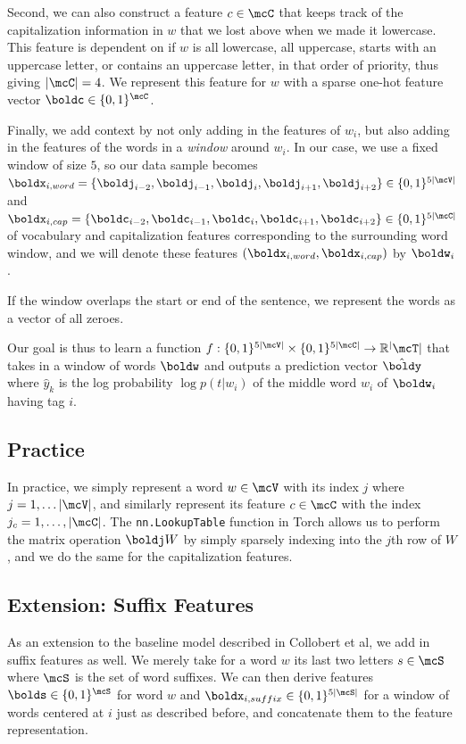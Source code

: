 \documentclass[11pt]{article}
\begin{document}
Second, we can also construct a feature $c \in \mcC$ that keeps track of the capitalization information in $w$ that we lost above when we made it lowercase. This feature is dependent on if $w$ is all lowercase, all uppercase, starts with an uppercase letter, or contains an uppercase letter, in that order of priority, thus giving $|\mcC| = 4$. We represent this feature for $w$ with a sparse one-hot feature vector $\boldc \in \{0,1\}^\mcC$.

Finally, we add context by not only adding in the features of $w_i$, but also adding in the features of the words in a \emph{window} around $w_i$. In our case, we use a fixed window of size $5$, so our data sample becomes $\boldx_{i, word} = \{\boldj_{i-2}, \boldj_{i-1}, \boldj_i, \boldj_{i+1}, \boldj_{i+2}\} \in \{0,1 \}^{5|\mcV|}$ and $\boldx_{i, cap} = \{\boldc_{i-2}, \boldc_{i-1}, \boldc_i, \boldc_{i+1}, \boldc_{i+2}\} \in \{0,1\}^{5|\mcC|}$ of vocabulary and capitalization features corresponding to the surrounding word window, and we will denote these features $(\boldx_{i, word}, \boldx_{i, cap})$ by $\boldw_i$.

If the window overlaps the start or end of the sentence, we represent the words as a vector of all zeroes.

Our goal is thus to learn a function $f: \{0,1\}^{5|\mcV|} \times \{0,1\}^{5|\mcC|} \to \mathbb{R}^|\mcT|$ that takes in a window of words $\boldw$ and outputs a prediction vector $\hat{\boldy}$ where $\hat{y}_k$ is the log probability $\log p(t|w_i)$ of the middle word $w_i$ of $\boldw_i$ having tag $i$.

\subsection{Practice}

In practice, we simply represent a word $w \in \mcV$ with its index $j$ where $j = 1, \ldots |\mcV|$, and similarly represent its feature $c \in \mcC$ with the index $j_c = 1, \ldots, |\mcC|$. The \texttt{nn.LookupTable} function in Torch allows us to perform the matrix operation $\boldj W$ by simply sparsely indexing into the $j$th row of $W$, and we do the same for the capitalization features.

\subsection{Extension: Suffix Features}

As an extension to the baseline model described in Collobert et al, we add in suffix features as well. We merely take for a word $w$ its last two letters $s \in \mcS$ where $\mcS$ is the set of word suffixes. We can then derive features $\bolds \in \{0, 1\}^\mcS$ for word $w$ and $\boldx_{i, suffix} \in \{0, 1\}^{5|\mcS|}$ for a window of words centered at $i$ just as described before, and concatenate them to the feature representation.
\end{document}
